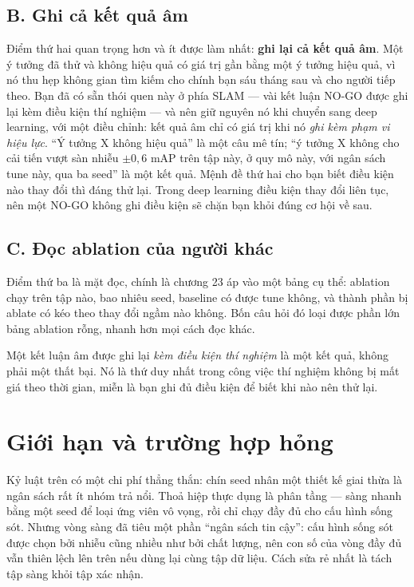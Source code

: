 \documentclass[../../deep_learning.tex]{subfiles}
\begin{document}
\subsection{B. Ghi cả kết quả âm}
Điểm thứ hai quan trọng hơn và ít được làm nhất: \textbf{ghi lại cả kết quả âm}. Một ý tưởng đã thử và không hiệu quả có giá trị gần bằng một ý tưởng hiệu quả, vì nó thu hẹp không gian tìm kiếm cho chính bạn sáu tháng sau và cho người tiếp theo. Bạn đã có sẵn thói quen này ở phía SLAM — vài kết luận NO-GO được ghi lại kèm điều kiện thí nghiệm — và nên giữ nguyên nó khi chuyển sang deep learning, với một điều chỉnh: kết quả âm chỉ có giá trị khi nó \emph{ghi kèm phạm vi hiệu lực}. ``Ý tưởng X không hiệu quả'' là một câu mê tín; ``ý tưởng X không cho cải tiến vượt sàn nhiễu \(\pm 0{,}6\) mAP trên tập này, ở quy mô này, với ngân sách tune này, qua ba seed'' là một kết quả. Mệnh đề thứ hai cho bạn biết điều kiện nào thay đổi thì đáng thử lại. Trong deep learning điều kiện thay đổi liên tục, nên một NO-GO không ghi điều kiện sẽ chặn bạn khỏi đúng cơ hội về sau.

\subsection{C. Đọc ablation của người khác}
Điểm thứ ba là mặt đọc, chính là chương 23 áp vào một bảng cụ thể: ablation chạy trên tập nào, bao nhiêu seed, baseline có được tune không, và thành phần bị ablate có kéo theo thay đổi ngầm nào không. Bốn câu hỏi đó loại được phần lớn bảng ablation rỗng, nhanh hơn mọi cách đọc khác.

\begin{cannho}
Một kết luận âm được ghi lại \emph{kèm điều kiện thí nghiệm} là một kết quả, không phải một thất bại. Nó là thứ duy nhất trong công việc thí nghiệm không bị mất giá theo thời gian, miễn là bạn ghi đủ điều kiện để biết khi nào nên thử lại. 
\end{cannho}

\section{Giới hạn và trường hợp hỏng}
Kỷ luật trên có một chi phí thẳng thắn: chín seed nhân một thiết kế giai thừa là ngân sách rất ít nhóm trả nổi. Thoả hiệp thực dụng là phân tầng — sàng nhanh bằng một seed để loại ứng viên vô vọng, rồi chỉ chạy đầy đủ cho cấu hình sống sót. Nhưng vòng sàng đã tiêu một phần ``ngân sách tin cậy'': cấu hình sống sót được chọn bởi nhiễu cũng nhiều như bởi chất lượng, nên con số của vòng đầy đủ vẫn thiên lệch lên trên nếu dùng lại cùng tập dữ liệu. Cách sửa rẻ nhất là tách tập sàng khỏi tập xác nhận.
\end{document}
